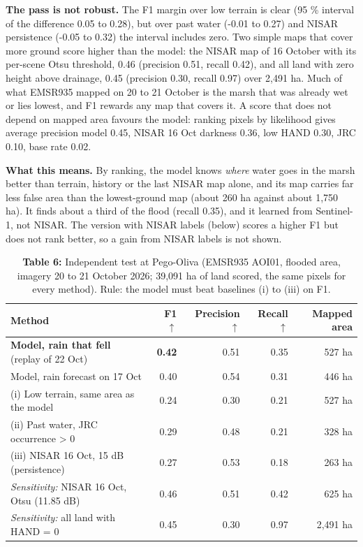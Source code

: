 \documentclass[10pt,twocolumn]{article}
\begin{document}
\textbf{The pass is not robust.} The F1 margin over low terrain is clear (95 \% interval of the difference 0.05 to 0.28), but over past water (-0.01 to 0.27) and NISAR persistence (-0.05 to 0.32) the interval includes zero. Two simple maps that cover more ground score higher than the model: the NISAR map of 16 October with its per-scene Otsu threshold, 0.46 (precision 0.51, recall 0.42), and all land with zero height above drainage, 0.45 (precision 0.30, recall 0.97) over 2,491 ha. Much of what EMSR935 mapped on 20 to 21 October is the marsh that was already wet or lies lowest, and F1 rewards any map that covers it. A score that does not depend on mapped area favours the model: ranking pixels by likelihood gives average precision model 0.45, NISAR 16 Oct darkness 0.36, low HAND 0.30, JRC 0.10, base rate 0.02.

\textbf{What this means.} By ranking, the model knows \emph{where} water goes in the marsh better than terrain, history or the last NISAR map alone, and its map carries far less false area than the lowest-ground map (about 260 ha against about 1,750 ha). It finds about a third of the flood (recall 0.35), and it learned from Sentinel-1, not NISAR. The version with NISAR labels (below) scores a higher F1 but does not rank better, so a gain from NISAR labels is not shown.

\begin{table}[tbp]
\centering
\caption{\textbf{Table 6:} Independent test at Pego-Oliva (EMSR935 AOI01, flooded area, imagery 20 to 21 October 2026; 39,091 ha of land scored, the same pixels for every method). Rule: the model must beat baselines (i) to (iii) on F1.}
\footnotesize
\begin{tabularx}{\textwidth}{Lrrrr}
\toprule
\textbf{Method} & \textbf{F1 $\uparrow$} & \textbf{Precision $\uparrow$} & \textbf{Recall $\uparrow$} & \textbf{Mapped area} \\
\midrule
{}\textbf{Model, rain that fell} (replay of 22 Oct) & \textbf{0.42} & 0.51 & 0.35 & 527 ha \\
{}Model, rain forecast on 17 Oct & 0.40 & 0.54 & 0.31 & 446 ha \\
{}(i) Low terrain, same area as the model & 0.24 & 0.30 & 0.21 & 527 ha \\
{}(ii) Past water, JRC occurrence > 0 & 0.29 & 0.48 & 0.21 & 328 ha \\
{}(iii) NISAR 16 Oct, \textminus{}15 dB (persistence) & 0.27 & 0.53 & 0.18 & 263 ha \\
{}\emph{Sensitivity:} NISAR 16 Oct, Otsu (\textminus{}11.85 dB) & 0.46 & 0.51 & 0.42 & 625 ha \\
{}\emph{Sensitivity:} all land with HAND = 0 & 0.45 & 0.30 & 0.97 & 2,491 ha \\
\bottomrule
\end{tabularx}
\end{table}
\end{document}

